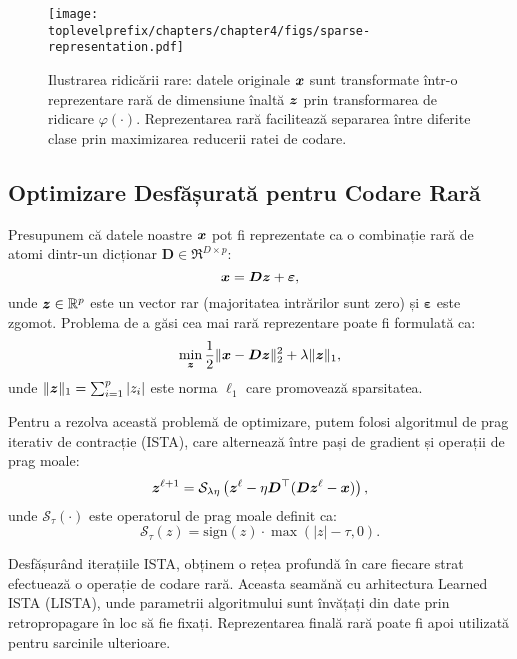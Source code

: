 \documentclass[../../book-main_ro.tex]{subfiles}
\begin{document}
\begin{figure}[t]
    \centering
    \texttt{[image: \\toplevelprefix/chapters/chapter4/figs/sparse-representation.pdf]}
    \caption{Ilustrarea ridicării rare: datele originale $\bm{x}$ sunt transformate într-o reprezentare rară de dimensiune înaltă $\bm{z}$ prin transformarea de ridicare $\varphi(\cdot)$. Reprezentarea rară facilitează separarea între diferite clase prin maximizarea reducerii ratei de codare.}
    \label{fig:sparse-lifting-illustration}
\end{figure}

\subsection{Optimizare Desfășurată pentru Codare Rară}

Presupunem că datele noastre $\bm{x}$ pot fi reprezentate ca o combinație rară de atomi dintr-un dicționar $\bm D \in \Re^{D \times p}$:
\begin{equation}
    \bm{x} = \bm D \bm{z} + \bm \varepsilon,
\end{equation}
unde $\bm{z} \in \mathbb{R}^p$ este un vector rar (majoritatea intrărilor sunt zero) și $\bm \varepsilon$ este zgomot. Problema de a găsi cea mai rară reprezentare poate fi formulată ca:
\begin{equation}\label{eq:sparse-coding}
    \min_{\bm{z}} \frac{1}{2}\|\bm{x} - \bm D \bm{z}\|_2^2 + \lambda \|\bm{z}\|_1,
\end{equation}
unde $\|\bm{z}\|_1 = \sum_{i=1}^p |z_i|$ este norma $\ell_1$ care promovează sparsitatea.

Pentru a rezolva această problemă de optimizare, putem folosi algoritmul de prag iterativ de contracție (ISTA), care alternează între pași de gradient și operații de prag moale:
\begin{equation}\label{eq:ista}
    \bm{z}^{\ell+1} = \mathcal{S}_{\lambda\eta}\left(\bm{z}^\ell - \eta \bm D^\top(\bm D \bm{z}^\ell - \bm{x})\right),
\end{equation}
unde $\mathcal{S}_{\tau}(\cdot)$ este operatorul de prag moale definit ca:
\begin{equation}
    \mathcal{S}_{\tau}(z) = \text{sign}(z) \cdot \max(|z| - \tau, 0).
\end{equation}

Desfășurând iterațiile ISTA, obținem o rețea profundă în care fiecare strat efectuează o operație de codare rară. Aceasta seamănă cu arhitectura Learned ISTA (LISTA), unde parametrii algoritmului sunt învățați din date prin retropropagare în loc să fie fixați. Reprezentarea finală rară poate fi apoi utilizată pentru sarcinile ulterioare.
\end{document}
